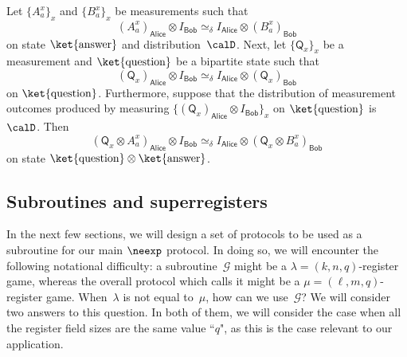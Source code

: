 \documentclass[11pt]{article}
\newcommand{\consistency}{\simeq}
\newcommand{\game}{\mathscr{G}}
\newcommand{\reg}[1]{{\mathsf{#1}}}
\begin{document}
\begin{fact}\label{fact:introspective-consistency}
Let $\{A^x_a\}_x$ and $\{B^x_a\}_x$ be measurements such that
\begin{equation}\label{eq:outro-approx}
(A^x_a)_{\reg{Alice}} \otimes I_{\reg{Bob}} \consistency_\delta I_{\reg{Alice}} \otimes (B^x_a)_{\reg{Bob}}
\end{equation}
on state $\ket{\mathrm{answer}}$ and distribution~$\calD$. Next, let $\{\mathsf{Q}_x\}_x$ be a measurement and $\ket{\mathrm{question}}$ be a bipartite state
such that
\begin{equation*}
(\mathsf{Q}_x)_{\reg{Alice}} \otimes I_{\reg{Bob}} \consistency_\delta I_{\reg{Alice}} \otimes (\mathsf{Q}_x)_{\reg{Bob}}
\end{equation*}
on $\ket{\mathrm{question}}$.
Furthermore, suppose that the distribution of measurement outcomes produced by measuring $\{(\mathsf{Q}_x)_{\reg{Alice}} \otimes I_{\reg{Bob}}\}_x$ on $\ket{\mathrm{question}}$ is $\calD$.
Then
\begin{equation}\label{eq:intro-approx}
(\mathsf{Q}_x \otimes A^x_a)_{\reg{Alice}} \otimes I_{\reg{Bob}} \consistency_{\delta} I_{\reg{Alice}} \otimes (\mathsf{Q}_x \otimes B^x_a)_{\reg{Bob}}
\end{equation}
on state $\ket{\mathrm{question}}\otimes
\ket{\mathrm{answer}}$.
\end{fact}

\subsection{Subroutines and superregisters}

In the next few sections, we will design a set of protocols
to be used as a subroutine for our main $\neexp$ protocol.
In doing so, we will encounter the following notational difficulty:
a subroutine~$\game$ might be a $\lambda = (k, n, q)$-register game,
whereas the overall protocol which calls it might be a $\mu = (\ell, m, q)$-register game.
When~$\lambda$ is not equal to~$\mu$, how can we use~$\game$?
We will consider two answers to this question.
In both of them, we will consider the case when all the register field sizes are the same value ``$q$",
as this is the case relevant to our application.
\end{document}
